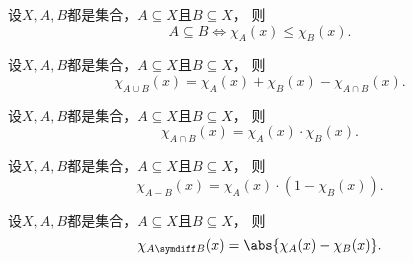 \begin{proposition}
设\(X,A,B\)都是集合，\(A \subseteq X\)且\(B \subseteq X\)，
则\[
	A \subseteq B
	\iff
	\chi_A(x) \leq \chi_B(x).
\]
\end{proposition}

\begin{proposition}
设\(X,A,B\)都是集合，\(A \subseteq X\)且\(B \subseteq X\)，
则\[
	\chi_{A \cup B}(x)
	= \chi_A(x) + \chi_B(x) - \chi_{A \cap B}(x).
\]
\end{proposition}

\begin{proposition}
设\(X,A,B\)都是集合，\(A \subseteq X\)且\(B \subseteq X\)，
则\[
	\chi_{A \cap B}(x)
	= \chi_A(x) \cdot \chi_B(x).
\]
\end{proposition}

\begin{proposition}
设\(X,A,B\)都是集合，\(A \subseteq X\)且\(B \subseteq X\)，
则\[
	\chi_{A - B}(x)
	= \chi_A(x) \cdot (1 - \chi_B(x)).
\]
\end{proposition}

\begin{proposition}
设\(X,A,B\)都是集合，\(A \subseteq X\)且\(B \subseteq X\)，
则\[
	\chi_{A \symdiff B}(x)
	= \abs{\chi_A(x) - \chi_B(x)}.
\]
\end{proposition}

